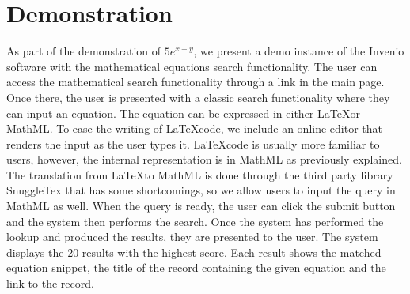 \documentclass{sig-alternate}
\begin{document}
\section{Demonstration}
As part of the demonstration of $5e^{x+y}$, we present a demo instance of the Invenio software with the mathematical equations search functionality.
The user can access the mathematical search functionality through a link in the main page. Once there, the user is presented with a classic search functionality where they can input an equation. The equation can be expressed in either \LaTeX or MathML. To ease the writing of \LaTeX code, we include an online editor\cite{latex_editor} that renders the input as the user types it. \LaTeX code is usually more familiar to users, however, the internal representation is in MathML as previously explained. The translation from \LaTeX to MathML is done through the third party library SnuggleTex\cite{snuggletex} that has some shortcomings, so we allow users to input the query in MathML as well. When the query is ready, the user can click the submit button and the system then performs the search. Once the system has performed the lookup and produced the results, they are presented to the user.
The system displays the 20 results with the highest score. Each result shows the matched equation snippet, the title of the record containing the given equation and the link to the record.

%
\end{document}
